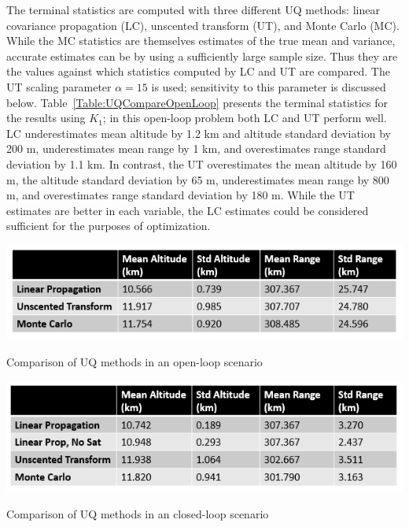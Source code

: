 The terminal statistics are computed with three different UQ methods: linear covariance propagation (LC), unscented transform (UT), and Monte Carlo (MC). While the MC statistics are themselves estimates of the true mean and variance, accurate estimates can be by using a sufficiently large sample size. Thus they are the values against which statistics computed by LC and UT are compared. The UT scaling parameter $\alpha=15$ is used; sensitivity to this parameter is discussed below. Table~\ref{Table:UQCompareOpenLoop} presents the terminal statistics for the results using $K_1$; in this open-loop problem both LC and UT perform well. LC underestimates mean altitude by 1.2 km and altitude standard deviation by 200 m, underestimates mean range by 1 km, and overestimates range standard deviation by 1.1 km. In contrast, the UT overestimates the mean altitude by 160 m, the altitude standard deviation by 65 m, underestimates mean range by 800 m, and overestimates range standard deviation by 180 m. While the UT estimates are better in each variable, the LC estimates could be considered sufficient for the purposes of optimization. 

\begin{table}[h!]
	\centering
	\includegraphics[width=1\textwidth]{Images/UQExample_Open}
	\caption{Comparison of UQ methods in an open-loop scenario}
	\label{Table:UQCompareOpenLoop}
\end{table}
\begin{table}[h!]
	\centering
	\includegraphics[width=1\textwidth]{Images/UQExample_Closed}
	\caption{Comparison of UQ methods in an closed-loop scenario}
	\label{Table:UQCompareClosedLoop}
\end{table}

